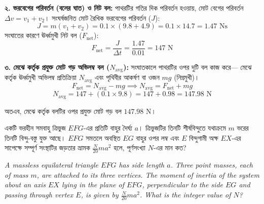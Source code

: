 \documentclass[12pt, a4paper]{article}
\begin{document}
{\begin{tcolorbox}[solutionbox={সমাধান (Solution)}]
\vspace{0.5em}
\textbf{২. ভরবেগের পরিবর্তন (বলের ঘাত) ও নিট বল:}
পাথরটির গতির দিক পরিবর্তন হওয়ায়, মোট বেগের পরিবর্তন $\Delta v = v_1 + v_2$। 
সংঘর্ষজনিত মোট রৈখিক ভরবেগের পরিবর্তন ($J$):
$$J = m (v_1 + v_2) = 0.1 \times (9.8 + 4.9) = 0.1 \times 14.7 = 1.47\text{ Ns}$$
সংঘাতের কারণে ঊর্ধ্বমুখী নিট বল ($F_{\text{net}}$):
$$F_{\text{net}} = \frac{J}{\Delta t} = \frac{1.47}{0.01} = 147\text{ N}$$

\vspace{0.5em}
\textbf{৩. মেঝে কর্তৃক প্রযুক্ত মোট গড় অভিলম্ব বল ($N_{\text{avg}}$):}
সংঘাতকালে পাথরটির ওপর দুটি বল কাজ করে— মেঝে কর্তৃক ঊর্ধ্বমুখী অভিলম্ব প্রতিক্রিয়া $N_{\text{avg}}$ এবং পৃথিবীর আকর্ষণ বা ওজন $mg$ (নিম্নমুখী)।
$$F_{\text{net}} = N_{\text{avg}} - mg \implies N_{\text{avg}} = F_{\text{net}} + mg$$
$$N_{\text{avg}} = 147 + (0.1 \times 9.8) = 147 + 0.98 = 147.98\text{ N}$$

অতএব, মেঝে কর্তৃক বলটির ওপর প্রযুক্ত মোট গড় বল $147.98\text{ N}$।
\end{tcolorbox}
\vspace{1em}
\begin{tcolorbox}[questionbox={প্রশ্ন (Question) 45}]
\noindent
একটি ভরহীন সমবাহু ত্রিভুজ $EFG$-এর প্রতিটি বাহুর দৈর্ঘ্য $a$। ত্রিভুজটির তিনটি শীর্ষবিন্দুতে যথাক্রমে $m$ ভরের তিনটি বিন্দু-বস্তু যুক্ত আছে। $EFG$ সমতলে অবস্থিত $EG$ বাহুর ওপর লম্ব এবং $E$ বিন্দুগামী অক্ষ $EX$-এর সাপেক্ষে সম্পূর্ণ সংস্থাটির জড়তার ভ্রামক $\frac{N}{20} m a^2$ হলে, পূর্ণসংখ্যা $N$-এর মান কত?

\vspace{0.8em}
\begin{english}
\noindent\textit{\color{darkgray}
A massless equilateral triangle $EFG$ has side length $a$. Three point masses, each of mass $m$, are attached to its three vertices. The moment of inertia of the system about an axis $EX$ lying in the plane of $EFG$, perpendicular to the side $EG$ and passing through vertex $E$, is given by $\frac{N}{20} m a^2$. What is the integer value of $N$?
}
\end{english}
\end{tcolorbox}

\vspace{1em}
\begin{center}
\end{center}}
\end{document}
